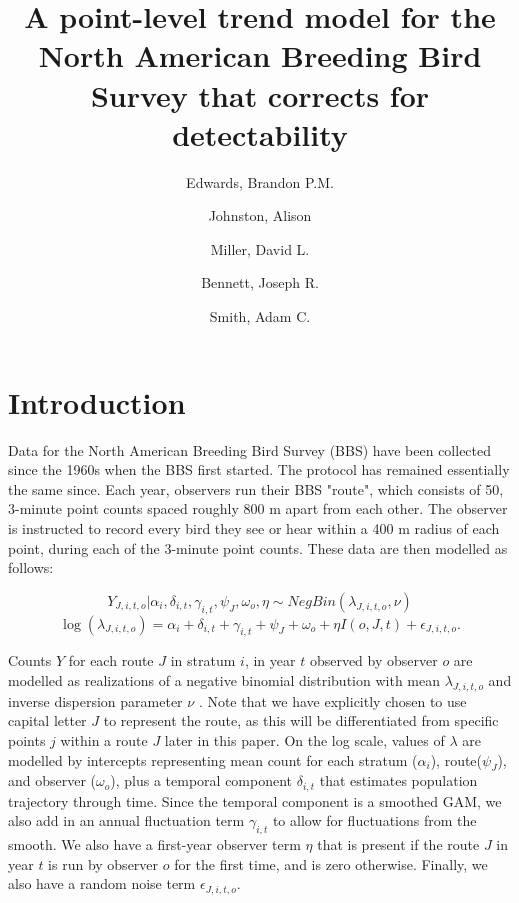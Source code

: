 \documentclass[12pt]{article}
\title{A point-level trend model for the North American Breeding Bird Survey that corrects for detectability}
\author{
	Edwards, Brandon P.M.\\
	\and
	Johnston, Alison\\
	\and
	Miller, David L.\\
	\and
	Bennett, Joseph R.\\
	\and
	Smith, Adam C.\\
}
\begin{document}
	
	\maketitle
	
		
	
\section{Introduction}
\par Data for the North American Breeding Bird Survey (BBS) have been collected since the 1960s when the BBS first started. 
The protocol has remained essentially the same since. 
Each year, observers run their BBS "route", which consists of 50, 3-minute point counts spaced roughly 800 m apart from each other. 
The observer is instructed to record every bird they see or hear within a 400 m radius of each point, during each of the 3-minute point counts. 
These data are then modelled as follows:

\begin{equation*}
	Y_{J,i,t,o} | \alpha_i, \delta_{i,t}, \gamma_{i,t}, \psi_J, \omega_o, \eta \sim NegBin(\lambda_{J,i,t,o}, \nu)
\end{equation*}
\begin{equation}\label{bbs}
\log(\lambda_{J,i,t,o}) = \alpha_i + \delta_{i,t} + \gamma_{i,t} + \psi_J + \omega_o + \eta I(o,J,t) + \epsilon_{J,i,t,o}.
\end{equation}

Counts $Y$ for each route $J$ in stratum $i$, in year $t$ observed by observer $o$ are modelled as realizations of a negative binomial distribution with mean $\lambda_{J,i,t,o}$ and inverse dispersion parameter $\nu$ \citet{smith_spatially_2023}. 
Note that we have explicitly chosen to use capital letter $J$ to represent the route, as this will be differentiated from specific points $j$ within a route $J$ later in this paper.
On the log scale, values of $\lambda$ are modelled by intercepts representing mean count for each stratum ($\alpha_i$), route($\psi_J$), and observer ($\omega_o$), plus a temporal component $\delta_{i,t}$ that estimates population trajectory through time. 
Since the temporal component is a smoothed GAM, we also add in an annual fluctuation term $\gamma_{i,t}$ to allow for fluctuations from the smooth. 
We also have a first-year observer term $\eta$ that is present if the route $J$ in year $t$ is run by observer $o$ for the first time, and is zero otherwise. 
Finally, we also have a random noise term $\epsilon_{J,i,t,o}$.
\end{document}
